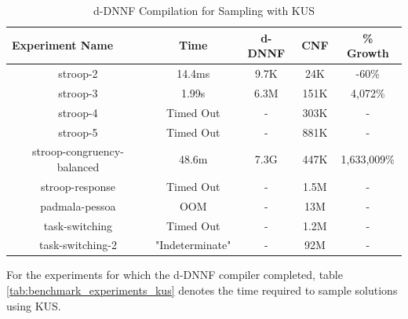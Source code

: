 \begin{table}[htb]
  \centering
  \caption{d-DNNF Compilation for Sampling with KUS}
\begin{tabular}{|c|c|c|c|c|}
\hline
\multicolumn{1}{|l|}{Experiment Name} & Time            & d-DNNF               & CNF            & \% Growth   \\ \hline
stroop-2                              & 14.4ms          & 9.7K                 & 24K            & -60\%       \\ \hline
stroop-3                              & 1.99s           & 6.3M                 & 151K           & 4,072\%     \\ \hline
stroop-4                              & Timed Out       & -                    & 303K           & -           \\ \hline
stroop-5                              & Timed Out       & -                    & 881K           & -           \\ \hline
stroop-congruency-balanced            & 48.6m           & 7.3G                 & 447K           & 1,633,009\% \\ \hline
stroop-response                       & Timed Out       & -                    & 1.5M           & -           \\ \hline
padmala-pessoa                        & OOM             & -                    & 13M            & -           \\ \hline
task-switching                        & Timed Out       & -                    & 1.2M           & -           \\ \hline
task-switching-2                      & "Indeterminate" & -                    & 92M            & -           \\ \hline %
\end{tabular}
\label{tab:benchmark_experiments_d4}
\end{table}

For the experiments for which the d-DNNF compiler completed, table \ref{tab:benchmark_experiments_kus} denotes the time required to sample solutions using KUS.


